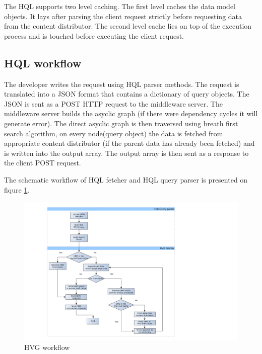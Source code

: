 The HQL supports two level caching. The first level caches the data model objects. It lays after parsing the client request strictly before requesting data from the content distributor. The second level cache lies on top of the execution process and is touched before executing the client request.  


\subsection{HQL workflow}

The developer writes the request using HQL parser methods. The request is translated into a JSON format that contains a dictionary of query objects. The JSON is sent as a POST HTTP request to the middleware server. The middleware server builds the asyclic graph (if there were dependency cycles it will generate error). The direct asyclic graph is then traversed using breath first search algorithm, on every node(query object) the data is fetched from appropriate content distributor (if the parent data has already been fetched) and is written into the output array. The output array is then sent as a response to the client POST request. 

The schematic workflow of HQL fetcher and HQL query parser is presented on fiqure \ref{fig:hvg_workflow}.

\begin{figure}[h]
	\begin{center}
		\includegraphics[width=20cm]{images/hvg_qp_workflow.png}
   		\caption{HVG workflow}
    	\label{fig:hvg_workflow}
	\end{center}
\end{figure}

